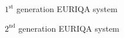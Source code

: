 \documentclass{beamer}
\begin{document}


\begin{frame}{$1^{\text{st}}$ generation EURIQA system}
  \begin{center}
    \begin{tikzpicture}
    \end{tikzpicture}
  \end{center}
\end{frame}



\begin{frame}{$2^{\text{nd}}$ generation EURIQA system}
  \begin{center}
    \begin{tikzpicture}
    \end{tikzpicture}
  \end{center}
\end{frame}


\end{document}

